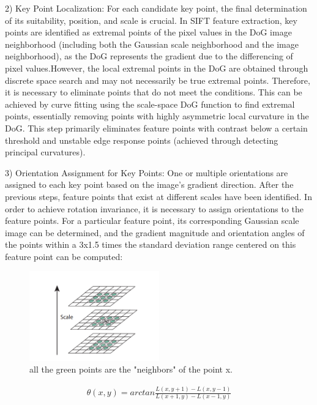 \documentclass[10pt,twocolumn,letterpaper]{article}
\begin{document}
2) Key Point Localization: For each candidate key point, the final determination of its suitability, position, and scale is crucial. In SIFT feature extraction, key points are identified as extremal points of the pixel values in the DoG image neighborhood (including both the Gaussian scale neighborhood and the image neighborhood), as the DoG represents the gradient due to the differencing of pixel values.However, the local extremal points in the DoG are obtained through discrete space search and may not necessarily be true extremal points. Therefore, it is necessary to eliminate points that do not meet the conditions. This can be achieved by curve fitting using the scale-space DoG function to find extremal points, essentially removing points with highly asymmetric local curvature in the DoG. This step primarily eliminates feature points with contrast below a certain threshold and unstable edge response points (achieved through detecting principal curvatures).

3) Orientation Assignment for Key Points: One or multiple orientations are assigned to each key point based on the image's gradient direction. After the previous steps, feature points that exist at different scales have been identified. In order to achieve rotation invariance, it is necessary to assign orientations to the feature points. For a particular feature point, its corresponding Gaussian scale image can be determined, and the gradient magnitude and orientation angles of the points within a 3x1.5 times the standard deviation range centered on this feature point can be computed:


\begin{figure}
  \centering %
  \includegraphics[width=0.5\textwidth]{image1.png} %
  \caption{all the green points are the "neighbors" of the point x.} %
  \label{fig1}
\end{figure}
	
  \begin{eqnarray}
		\theta(x,y)=arctan\frac{L(x,y+1)-L(x,y-1)}{L(x+1,y)-L(x-1,y)}
  \end{eqnarray}
\end{document}
